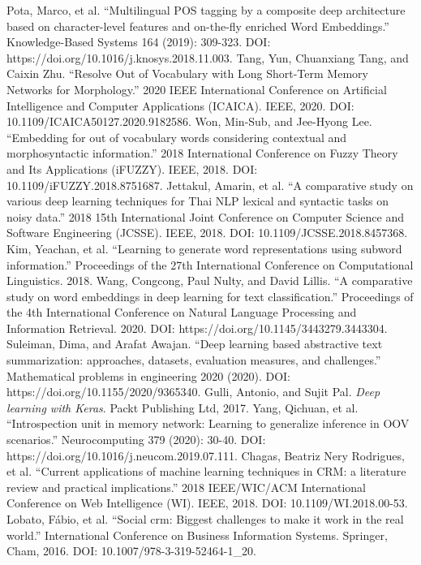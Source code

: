 \documentclass[conference]{IEEEtran}
\begin{document}
\begin{thebibliography}{00}
 Pota, Marco, et al. ``Multilingual POS tagging by a composite deep architecture based on character-level features and on-the-fly enriched Word Embeddings.'' Knowledge-Based Systems 164 (2019): 309-323. DOI: https://doi.org/10.1016/j.knosys.2018.11.003.
 Tang, Yun, Chuanxiang Tang, and Caixin Zhu. ``Resolve Out of Vocabulary with Long Short-Term Memory Networks for Morphology.'' 2020 IEEE International Conference on Artificial Intelligence and Computer Applications (ICAICA). IEEE, 2020. DOI: 10.1109/ICAICA50127.2020.9182586.
 Won, Min-Sub, and Jee-Hyong Lee. ``Embedding for out of vocabulary words considering contextual and morphosyntactic information.'' 2018 International Conference on Fuzzy Theory and Its Applications (iFUZZY). IEEE, 2018. DOI: 10.1109/iFUZZY.2018.8751687.
 Jettakul, Amarin, et al. ``A comparative study on various deep learning techniques for Thai NLP lexical and syntactic tasks on noisy data.'' 2018 15th International Joint Conference on Computer Science and Software Engineering (JCSSE). IEEE, 2018. DOI: 10.1109/JCSSE.2018.8457368.
 Kim, Yeachan, et al. ``Learning to generate word representations using subword information.'' Proceedings of the 27th International Conference on Computational Linguistics. 2018.
 Wang, Congcong, Paul Nulty, and David Lillis. ``A comparative study on word embeddings in deep learning for text classification.'' Proceedings of the 4th International Conference on Natural Language Processing and Information Retrieval. 2020. DOI: https://doi.org/10.1145/3443279.3443304.
 Suleiman, Dima, and Arafat Awajan. ``Deep learning based abstractive text summarization: approaches, datasets, evaluation measures, and challenges.'' Mathematical problems in engineering 2020 (2020). DOI: https://doi.org/10.1155/2020/9365340.
 Gulli, Antonio, and Sujit Pal. \textit{Deep learning with Keras}. Packt Publishing Ltd, 2017.
 Yang, Qichuan, et al. ``Introspection unit in memory network: Learning to generalize inference in OOV scenarios.'' Neurocomputing 379 (2020): 30-40. DOI: https://doi.org/10.1016/j.neucom.2019.07.111.
 Chagas, Beatriz Nery Rodrigues, et al. ``Current applications of machine learning techniques in CRM: a literature review and practical implications.'' 2018 IEEE/WIC/ACM International Conference on Web Intelligence (WI). IEEE, 2018. DOI: 10.1109/WI.2018.00-53.
 Lobato, Fábio, et al. ``Social crm: Biggest challenges to make it work in the real world.'' International Conference on Business Information Systems. Springer, Cham, 2016. DOI: 10.1007/978-3-319-52464-1\_20.

\end{thebibliography}
\end{document}
